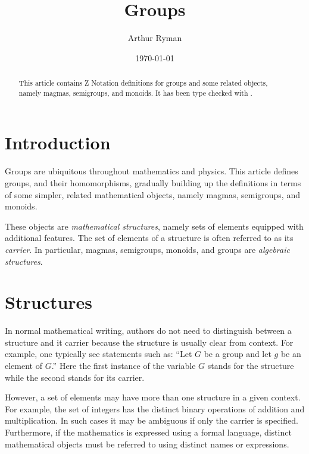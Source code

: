 \documentclass{amsart}
\begin{document}
\title{Groups}
\author{Arthur Ryman}
\date{\today}

\begin{abstract}
This article contains Z Notation definitions for groups and some related objects, namely magmas, semigroups, and monoids.
It has been type checked with \fuzz.
\end{abstract}

\maketitle

\tableofcontents

\section{Introduction}

Groups are ubiquitous throughout mathematics and physics.
This article defines groups, and their homomorphisms,
gradually building up the definitions in terms of some simpler, related mathematical objects,
namely magmas, semigroups, and monoids.

These objects are \textit{mathematical structures}, namely sets of elements equipped with additional features.
The set of elements of a structure is often referred to as its \textit{carrier}.
In particular, magmas, semigroups, monoids, and groups are \textit{algebraic structures}. 

\section{Structures}

In normal mathematical writing, authors do not need to distinguish between a structure and it carrier
because the structure is usually clear from context.
For example, one typically see statements such as:  
``Let $G$ be a group and let $g$ be an element of $G$.''
Here the first instance of the variable $G$ stands for the structure while the second stands for its carrier.

However, a set of elements may have more than one structure in a given context.
For example, the set of integers has the distinct binary operations of addition and multiplication.
In such cases it may be ambiguous if only the carrier is specified.
Furthermore, if the mathematics is expressed using a formal language, distinct mathematical objects
must be referred to using distinct names or expressions.
\end{document}

